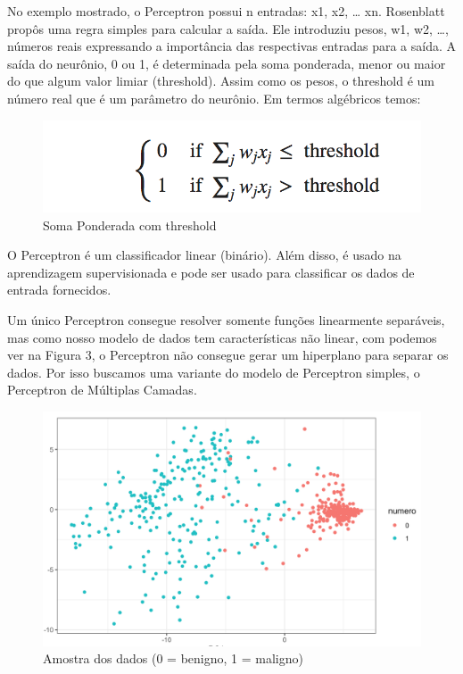 \documentclass[conference]{IEEEtran}
\begin{document}
	No exemplo mostrado, o Perceptron possui n entradas: x1, x2, … xn. Rosenblatt propôs uma regra simples para calcular a saída. Ele introduziu pesos, w1, w2, …, números reais expressando a importância das respectivas entradas para a saída. A saída do neurônio, 0 ou 1, é determinada pela soma ponderada, menor ou maior do que algum valor limiar (threshold). Assim como os pesos, o threshold é um número real que é um parâmetro do neurônio. Em termos algébricos temos:
	
	\begin{figure}[htbp]
	\centerline{\includegraphics[scale=0.8]{Perceptron-threshold.png}}
	\caption{Soma Ponderada com threshold}
	\label{fig}
	\end{figure}

    O Perceptron é um classificador linear (binário). Além disso, é usado na aprendizagem supervisionada e pode ser usado para classificar os dados de entrada fornecidos.
    
    Um único Perceptron consegue resolver somente funções linearmente separáveis,  mas como nosso modelo de dados tem características não linear, com podemos ver na Figura 3, o Perceptron não consegue gerar um hiperplano para separar os dados. Por isso buscamos uma variante do modelo de Perceptron simples, o Perceptron de Múltiplas Camadas.
    
    \begin{figure}[htbp]
	\centerline{\includegraphics[scale=0.3]{dados-cancer.png}}
	\caption{Amostra dos dados (0 = benigno, 1 = maligno)}
	\label{fig}
	\end{figure}
    
\end{document}
